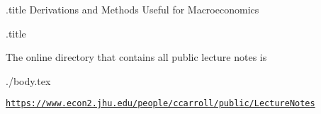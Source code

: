\documentclass{handout}
\newcommand{\entrylabel}[1]{\mbox{\small \texttt{#1}:}\hfil}
\newenvironment{entry}
  {\begin{list}{}
      {\renewcommand{\makelabel}{\entrylabel}
       \setlength{\labelwidth}{1.5in}
       \setlength{\labelsep}{0.1in}
       \setlength{\leftmargin}{\labelwidth}
}}
{\end{list}}
\begin{document}
\handoutHeader

\begin{verbatimwrite}{\jobname.title}
Derivations and Methods Useful for Macroeconomics
\end{verbatimwrite}

\centerline{\LARGE  \jobname.title}

\medskip\medskip

The online directory that contains all public lecture notes is 
\newcommand{\publec}{https://www.econ2.jhu.edu/people/ccarroll/public/LectureNotes}
\newcommand{\toDir}{\publec/MathFacts}

\begin{verbatimwrite}{./body.tex}

\centerline{\href{\publec}{\texttt{\publec}}}

\newcommand{\dir}{/Volumes/Data/Courses/Choice/LectureNotes/MathFacts/Handouts}




\newcommand{\hBoth}[1]{\href{\toDir/#1.pdf}{[pdf]}\href{\toDir/#1}{[html]}}
\begin{entry}



\end{entry}


\end{verbatimwrite}


\end{document}
